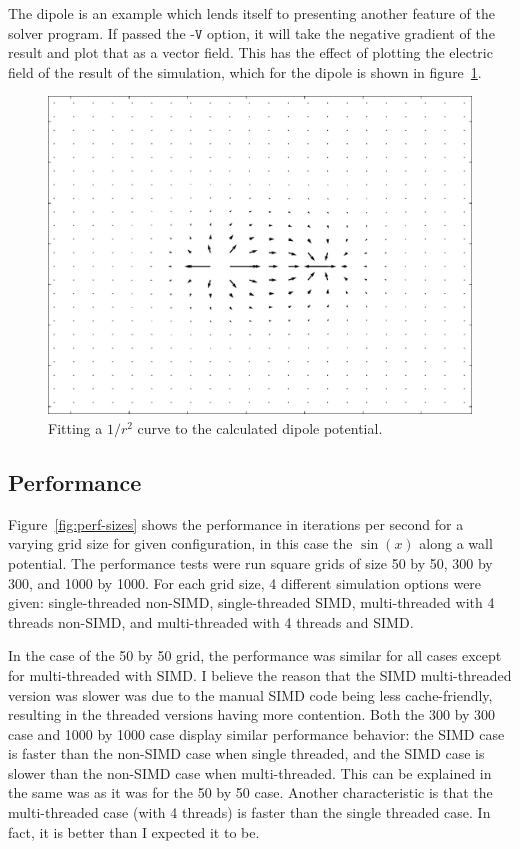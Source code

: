 The dipole is an example which lends itself to presenting another feature of the solver program. If passed the
$\texttt{-V}$ option, it will take the negative gradient of the result and plot that as a vector field. This has
the effect of plotting the electric field of the result of the simulation, which for the dipole is shown in
figure~\ref{fig:dipole-field}.

	\begin{figure}[h]
	\centering
	\includegraphics[width=0.7\linewidth]{dipole_field.pdf}
	\caption{Fitting a $1/r^2$ curve to the calculated dipole potential.} \label{fig:dipole-field}
	\end{figure}


\subsection{Performance}


Figure~\ref{fig:perf-sizes} shows the performance in iterations per second for a varying grid size for given
configuration, in this case the $\sin(x)$ along a wall potential. The performance tests were run square grids
of size 50 by 50, 300 by 300, and 1000 by 1000. For each grid size, 4 different simulation options were given:
single-threaded non-SIMD, single-threaded SIMD, multi-threaded with 4 threads non-SIMD, and multi-threaded
with 4 threads and SIMD.

In the case of the 50 by 50 grid, the performance was similar for all cases
except for multi-threaded with SIMD. I believe the reason that the SIMD multi-threaded version was slower was
due to the manual SIMD code being less cache-friendly, resulting in the threaded versions having more contention.
Both the 300 by 300 case and 1000 by 1000 case display similar performance behavior: the SIMD case is faster than
the non-SIMD case when single threaded, and the SIMD case is slower than the non-SIMD case when multi-threaded.
This can be explained in the same was as it was for the 50 by 50 case. Another characteristic is that the multi-threaded
case (with 4 threads) is faster than the single threaded case. In fact, it is better than I expected it to be.

